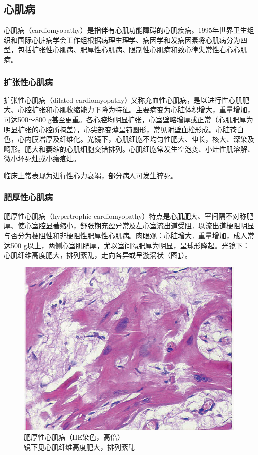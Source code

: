 \subsection{心肌病}

心肌病（cardiomyopathy）是指伴有心肌功能障碍的心肌疾病。1995年世界卫生组织和国际心脏病学会工作组根据病理生理学、病因学和发病因素将心肌病分为四型，包括扩张性心肌病、肥厚性心肌病、限制性心肌病和致心律失常性右心心肌病。

\subsubsection{扩张性心肌病}

扩张性心肌病（dilated
cardiomyopathy）又称充血性心肌病，是以进行性心肌肥大、心腔扩张和心肌收缩能力下降为特征。主要病变为心脏体积增大，重量增加，可达500～800
g甚至更重。各心腔均明显扩张，心室壁略增厚或正常（心肌肥厚为明显扩张的心腔所掩盖），心尖部变薄呈钝圆形，常见附壁血栓形成。心脏苍白色，心内膜增厚及纤维化。光镜下，心肌细胞不均匀性肥大、伸长，核大、深染及畸形。肥大和萎缩的心肌细胞交错排列。心肌细胞常发生空泡变、小灶性肌溶解、微小坏死灶或小瘢痕灶。

临床上常表现为进行性心力衰竭，部分病人可发生猝死。

\subsubsection{肥厚性心肌病}

肥厚性心肌病（hypertrophic
cardiomyopathy）特点是心肌肥大、室间隔不对称肥厚、使心室腔显著缩小，舒张期充盈异常及左心室流出道受阻，以流出道梗阻明显与否分为梗阻性和非梗阻性肥厚性心肌病。肉眼观：心脏增大，重量增加，成人常达500
g以上，两侧心室肌肥厚，尤以室间隔肥厚为明显，呈球形隆起。光镜下：心肌纤维高度肥大，排列紊乱，走向各异或呈漩涡状（图\ref{fig6-15}）。

\begin{figure}[!htbp]
    \centering
    \includegraphics{./images/Image00108.jpg}
    \captionsetup{justification=centering}
    \caption{肥厚性心肌病（HE染色，高倍）\\{\small 镜下见心肌纤维高度肥大，排列紊乱}}
    \label{fig6-15}
\end{figure}



